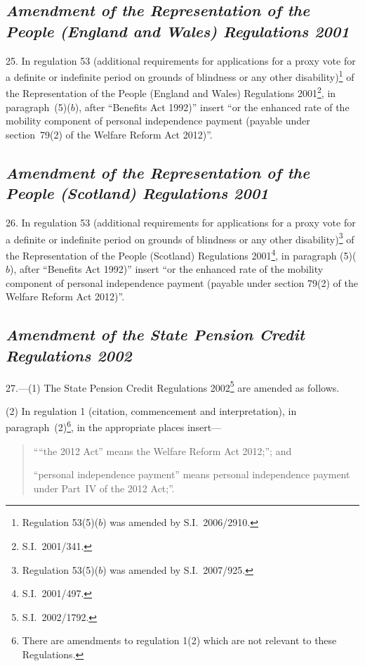 \documentclass[12pt,a4paper]{article}
\begin{document}
\subsection*{\itshape Amendment of the Representation of the People (England and Wales) Regulations 2001}

25.  In regulation 53 (additional requirements for applications for a proxy vote for a definite or indefinite period on grounds of blindness or any other disability)\footnote{Regulation 53(5)($b$)  was amended by S.I.~2006/2910.} of the Representation of the People (England and Wales) Regulations 2001\footnote{S.I.~2001/341.}, in paragraph~(5)($b$), after “Benefits Act 1992)” insert “or the enhanced rate of the mobility component of personal independence payment (payable under section~79(2) of the Welfare Reform Act 2012)”.

\subsection*{\itshape Amendment of the Representation of the People (Scotland) Regulations 2001}

26.  In regulation 53 (additional requirements for applications for a proxy vote for a definite or indefinite period on grounds of blindness or any other disability)\footnote{Regulation 53(5)($b$)  was amended by S.I.~2007/925.} of the Representation of the People (Scotland) Regulations 2001\footnote{S.I.~2001/497.}, in paragraph (5)($b$), after “Benefits Act 1992)” insert “or the enhanced rate of the mobility component of personal independence payment (payable under section 79(2) of the Welfare Reform Act 2012)”.

\subsection*{\itshape Amendment of the State Pension Credit Regulations 2002}

27.—(1) The State Pension Credit Regulations 2002\footnote{S.I.~2002/1792.} are amended as follows.

(2) In regulation 1 (citation, commencement and interpretation), in paragraph~(2)\footnote{There are amendments to regulation 1(2) which are not relevant to these Regulations.}, in the appropriate places insert—
\begin{quotation}
““the 2012 Act” means the Welfare Reform Act 2012;”; and

“personal independence payment” means personal independence payment under Part~IV of the 2012 Act;”.
\end{quotation}
\end{document}

